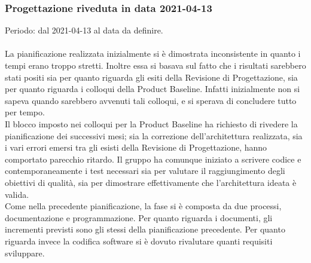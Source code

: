 \documentclass[../piano_di_progetto.tex]{subfiles}
\begin{document}
\subsubsection{Progettazione riveduta in data 2021-04-13}
Periodo: dal 2021-04-13 al data da definire.\\ \\
La pianificazione realizzata inizialmente si è dimostrata inconsistente in quanto i tempi erano troppo stretti. Inoltre essa si basava sul fatto che i risultati sarebbero stati 
positi sia per quanto riguarda gli esiti della Revisione di Progettazione, sia per quanto riguarda i colloqui della Product Baseline. Infatti inizialmente non si sapeva quando sarebbero
avvenuti tali colloqui, e si sperava di concludere tutto per tempo.\\
Il blocco imposto nei colloqui per la Product Baseline ha richiesto di rivedere la pianificazione dei successivi mesi; sia la correzione dell'architettura realizzata, 
sia i vari errori emersi tra gli esisti della Revisione di Progettazione, hanno comportato parecchio ritardo. Il gruppo ha comunque iniziato a scrivere codice e contemporaneamente 
i test necessari sia per valutare il raggiungimento degli obiettivi di qualità, sia per dimostrare effettivamente che l'architettura ideata è valida. \\
Come nella precedente pianificazione, la fase si è composta da due processi, documentazione e programmazione. Per quanto riguarda i documenti, gli incrementi previsti 
sono gli stessi della pianificazione precedente. Per quanto riguarda invece la codifica software si è dovuto rivalutare quanti requisiti sviluppare. \\
\end{document}
